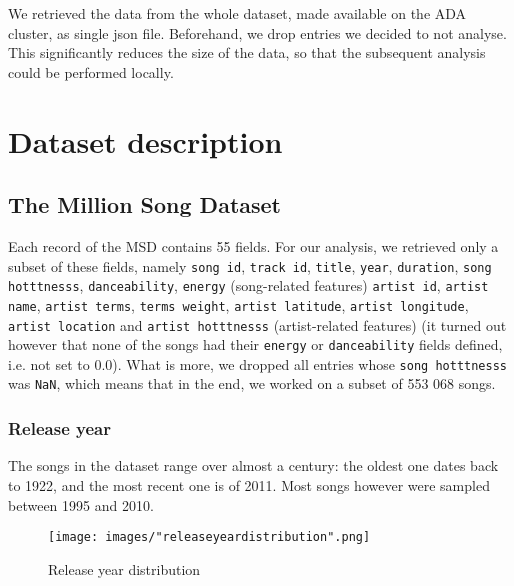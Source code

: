 \documentclass[10pt]{article}
\renewcommand\_{\textunderscore\allowbreak}
\begin{document}
We retrieved the data from the whole dataset, made available on the ADA cluster, as single json file. Beforehand, we drop entries we decided to not analyse. 
This significantly reduces the size of the data, so that the subsequent analysis could be performed locally.

\section{Dataset description}
\subsection{The Million Song Dataset}
Each record of the MSD contains 55 fields.
For our analysis, we retrieved only a subset of these fields, namely \texttt{song id}, \texttt{track id}, \texttt{title}, \texttt{year}, \texttt{duration}, \texttt{song hotttnesss}, \texttt{danceability}, \texttt{energy} (song-related features) \texttt{artist id}, \texttt{artist name}, \texttt{artist terms}, \texttt{terms weight}, \texttt{artist latitude},  \texttt{artist longitude}, \texttt{artist location} and \texttt{artist hotttnesss} (artist-related features) 
(it turned out however that none of the songs had their \texttt{energy} or \texttt{danceability} fields defined, i.e. not set to 0.0).
What is more, we dropped all entries whose \texttt{song hotttnesss} was \texttt{NaN}, which means that in the end, we worked on a subset of 553 068 songs.

\subsubsection{Release year}
The songs in the dataset range over almost a century: the oldest one dates back to 1922, and the most recent one is of 2011. Most songs however were sampled between 1995 and 2010.

\begin{figure}[h!]
\centering
\captionsetup{width=1.0\textwidth}
\texttt{[image: images/"release\_year\_distribution".png]}
\caption{Release year distribution}
\label{fig:song_duration}
\end{figure}
\end{document}
